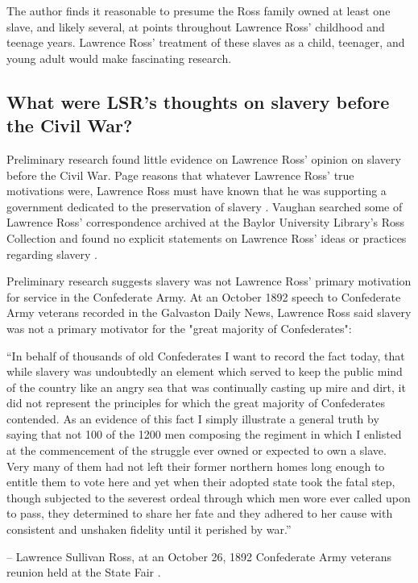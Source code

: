 \documentclass[12pt]{article}
\begin{document}
The author finds it reasonable to presume the Ross family owned at least one slave, and likely several, at points throughout Lawrence Ross' childhood and teenage years. Lawrence Ross' treatment of these slaves as a child, teenager, and young adult would make fascinating research. 

\newpage
\subsection{What were LSR's thoughts on slavery before the Civil War? }
Preliminary research found little evidence on Lawrence Ross' opinion on slavery before the Civil War. Page reasons that whatever Lawrence Ross' true motivations were, Lawrence Ross must have known that he was supporting a government dedicated to the preservation of slavery \cite[pg. 59]{page}. Vaughan searched some of Lawrence Ross' correspondence archived at the Baylor University Library's Ross Collection and found no explicit statements on Lawrence Ross' ideas or practices regarding slavery \cite{vaughan:email}. 

Preliminary research suggests slavery was not Lawrence Ross' primary motivation for service in the Confederate Army. At an October 1892 speech to Confederate Army veterans recorded in the Galvaston Daily News, Lawrence Ross said slavery was not a primary motivator for the "great majority of Confederates":

\begin{displayquote}
“In behalf of thousands of old Confederates I want to record the fact today, that while slavery was undoubtedly an element which served to keep the public mind of the country like an angry sea that was continually casting up mire and dirt, it did not represent the principles for which the great majority of Confederates contended.  As an evidence of this fact I simply illustrate a general truth by saying that not 100 of the 1200 men composing the regiment in which I enlisted at the commencement of the struggle ever owned or expected to own a slave.  Very many of them had not left their former northern homes long enough to entitle them to vote here and yet when their adopted state took the fatal step, though subjected to the severest ordeal through which men wore ever called upon to pass, they determined to share her fate and they adhered to her cause with consistent and unshaken fidelity until it perished by war.” 

-- Lawrence Sullivan Ross, at an October 26, 1892 Confederate Army veterans reunion held at the State Fair \cite{gdaily:1892-10-26}.
\end{displayquote}
\end{document}
